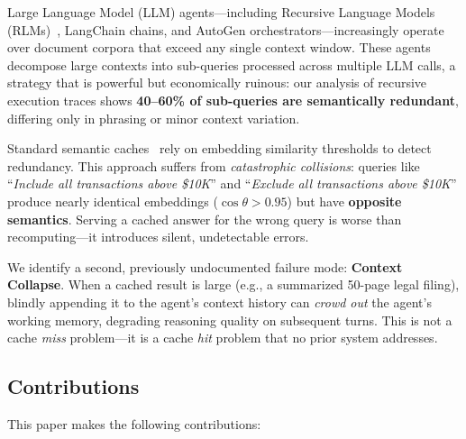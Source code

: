 \documentclass[11pt,twocolumn]{article}
\begin{document}
Large Language Model (LLM) agents---including Recursive Language Models (RLMs)~\cite{zhang2025rlm}, LangChain chains, and AutoGen orchestrators---increasingly operate over document corpora that exceed any single context window. These agents decompose large contexts into sub-queries processed across multiple LLM calls, a strategy that is powerful but economically ruinous: our analysis of recursive execution traces shows \textbf{40--60\% of sub-queries are semantically redundant}, differing only in phrasing or minor context variation.

Standard semantic caches~\cite{bang2023gptcache} rely on embedding similarity thresholds to detect redundancy. This approach suffers from \textit{catastrophic collisions}: queries like ``\textit{Include all transactions above \$10K}'' and ``\textit{Exclude all transactions above \$10K}'' produce nearly identical embeddings ($\cos \theta > 0.95$) but have \textbf{opposite semantics}. Serving a cached answer for the wrong query is worse than recomputing---it introduces silent, undetectable errors.

We identify a second, previously undocumented failure mode: \textbf{Context Collapse}. When a cached result is large (e.g., a summarized 50-page legal filing), blindly appending it to the agent's context history can \textit{crowd out} the agent's working memory, degrading reasoning quality on subsequent turns. This is not a cache \textit{miss} problem---it is a cache \textit{hit} problem that no prior system addresses.

\subsection{Contributions}

This paper makes the following contributions:
\end{document}
